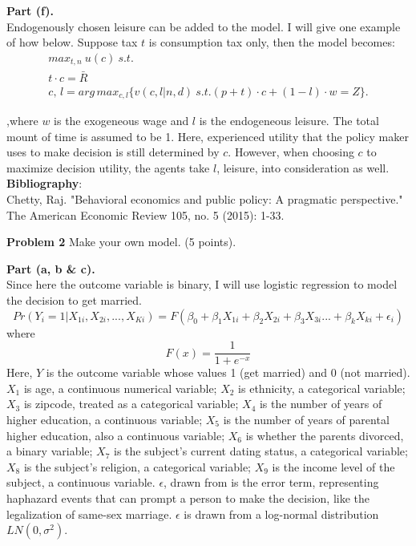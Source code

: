\documentclass[letterpaper,12pt]{article}
\theoremstyle{definition}
\begin{document}
\textbf{Part (f).} \\
Endogenously chosen leisure can be added to the model. I will give one example of how below. Suppose tax $t$ is consumption tax only, then the model becomes:\\

\begin{align}\label{model2}
max_{t,n} \ u(c) \ s.t.\\
t \cdot c=\bar{R}\\
c,\,l = arg\,max_{c,l}\{v(c,l|n,d) \ s.t.(p+t) \cdot c+(1-l) \cdot w=Z\}.
\end{align}

,where $w$ is the exogeneous wage and $l$ is the endogeneous leisure. The total mount of time is assumed to be 1. Here, experienced utility that the policy maker uses to make decision is still determined by $c$. However, when choosing $c$ to maximize decision utility, the agents take $l$, leisure, into consideration as well.\\

\noindent \textbf{Bibliography}:\\
Chetty, Raj. "Behavioral economics and public policy: A pragmatic perspective." The American Economic Review 105, no. 5 (2015): 1-33. 

\vspace{5mm}

\noindent\textbf{Problem 2}
Make your own model. (5 points).

\textbf{Part (a, b \& c).} \\
Since here the outcome variable is binary, I will use logistic regression to model the decision to get married. 
\begin{equation}\label{model3}
	Pr(Y_i=1|X_{1i}, X_{2i}, ..., X_{Ki}) = F(\beta_0+\beta_1 X_{1i}+\beta_{2} X_{2i}+ \beta_{3} X_{3i} ... + \beta_{k} X_{ki} + \epsilon_i)
\end{equation}
where
\begin{equation}
	F(x) = \frac{1}{1+e^{-x}}
\end{equation}
Here, $Y$ is the outcome variable whose values 1 (get married) and 0 (not married). $X_1$ is age, a continuous numerical variable; $X_2$ is ethnicity, a categorical variable; $X_3$ is zipcode, treated as a categorical variable; $X_4$ is the number of years of higher education, a continuous variable; $X_5$ is the number of years of parental higher education, also a continuous variable; $X_6$ is whether the parents divorced, a binary variable; $X_7$ is the subject's current dating status, a categorical variable; $X_8$ is the subject's religion, a categorical variable; $X_9$ is the income level of the subject, a continuous variable. $\epsilon$, drawn from  is the error term, representing haphazard events that can prompt a person to make the decision, like the legalization of same-sex marriage. $\epsilon$ is drawn from a log-normal distribution $LN(0,\sigma^2)$. 
\end{document}
